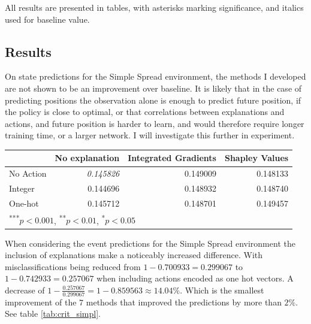 \documentclass[UKenglish]{uiomasterthesis}
\begin{document}
All results are presented in tables, with asterisks marking significance, and italics used for baseline value.

\begin{figure}[!ht]
	
	\label{fig:pred_loss_n_ig} 
\end{figure}


\subsection{Results}

On state predictions for the Simple Spread environment, the methods I developed are not shown to be an improvement over baseline. It is likely that in the case of predicting positions the observation alone is enough to predict future position, if the policy is close to optimal, or that correlations between explanations and actions, and future position is harder to learn, and would therefore require longer training time, or a larger network. I will investigate this further in experiment.

\begin{center}
\label{tab:state_simpl}
\begin{tabular}{lrrr}
\toprule
 & No explanation & Integrated Gradients & Shapley Values \\
\midrule
No Action & \textit{0.145826} & 0.149009 & 0.148133 \\
Integer & 0.144696 & 0.148932 & 0.148740 \\
One-hot & 0.145712 & 0.148701 & 0.149457 \\
\bottomrule
\multicolumn{3}{l}{\textsuperscript{***}$p<0.001$, 
  \textsuperscript{**}$p<0.01$, 
  \textsuperscript{*}$p<0.05$}
\end{tabular}
\end{center}


When considering the event predictions for the Simple Spread environment the inclusion of explanations make a noticeably increased difference. With misclassifications being reduced from $1 - 0.700933 = 0.299067$ to $1-0.742933=0.257067$ when including actions encoded as one hot vectors. A decrease of $1 - \frac{0.257067}{0.299067} = 1 - 0.859563 \approx 14.04\%$. Which is the smallest improvement of the $7$ methods that improved the predictions by more than $2\%$. See table \ref{tab:crit_simpl}.
\end{document}

